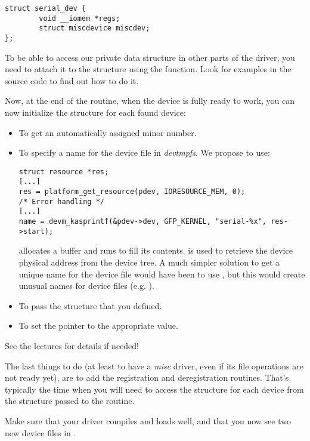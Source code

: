 \begin{verbatim}
struct serial_dev {
        void __iomem *regs;
        struct miscdevice miscdev;
};
\end{verbatim}

To be able to access our private data structure in other parts of the
driver, you need to attach it to the  structure using the
 function. Look for examples in the
source code to find out how to do it.

Now, at the end of the  routine, when the device is fully ready
to work, you can now initialize the  structure
for each found device:

\begin{itemize}
\item To get an automatically assigned minor number.
\item To specify a name for the device file in {\em devtmpfs}. We
  propose to use:
  \begin{verbatim}
struct resource *res;
[...]
res = platform_get_resource(pdev, IORESOURCE_MEM, 0);
/* Error handling */
[...]
name = devm_kasprintf(&pdev->dev, GFP_KERNEL, "serial-%x", res->start);
  \end{verbatim}
   allocates a buffer and runs 
  to fill its contents.  is used to
  retrieve the device physical address from the device tree.
  A much simpler solution to get a unique name for the device file
  would have been to use , but this would create
  unusual names for device files (e.g. ).
\item To pass the  structure that you defined.
\item To set the  pointer to the appropriate value.
\end{itemize}

See the lectures for details if needed!

The last things to do (at least to have a {\em misc} driver, even if
its file operations are not ready yet), are to add the registration and
deregistration routines. That's typically the time when you will need
to access the  structure for each device from the
 structure passed to the  routine.

Make sure that your driver compiles and loads well, and that you
now see two new device files in .


